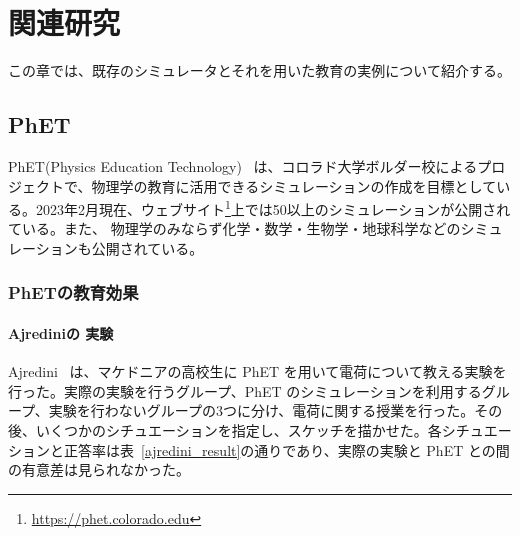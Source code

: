 \chapter{関連研究} \label{related}

この章では、既存のシミュレータとそれを用いた教育の実例について紹介する。

\section{PhET}

PhET(Physics Education Technology)~\cite{perkins_phet_2006} は、コロラド大学ボルダー校によるプロジェクトで、物理学の教育に活用できるシミュレーションの作成を目標としている。2023年2月現在、ウェブサイト\footnote{\url{https://phet.colorado.edu}}上では50以上のシミュレーションが公開されている。また、
物理学のみならず化学・数学・生物学・地球科学などのシミュレーションも公開されている。

\subsection{PhETの教育効果}

\subsubsection{Ajrediniの 実験}

Ajredini~\cite{ajredini_real_2014} は、マケドニアの高校生に PhET を用いて電荷について教える実験を行った。実際の実験を行うグループ、PhET のシミュレーションを利用するグループ、実験を行わないグループの3つに分け、電荷に関する授業を行った。その後、いくつかのシチュエーションを指定し、スケッチを描かせた。各シチュエーションと正答率は表~\ref{ajredini_result}の通りであり、実際の実験と PhET との間の有意差は見られなかった。

